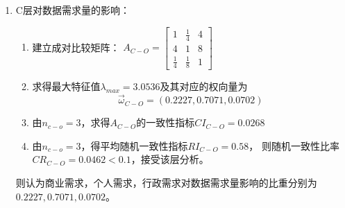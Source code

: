 \documentclass[UTF8,12pt]{ctexart}
\begin{document}
\begin{enumerate}
    \item C层对数据需求量的影响：
          \begin{enumerate}
              \item 建立成对比较矩阵：
                    $A_{C-O}=\begin{bmatrix}
                            1           & \frac{1}{4} & 4 \\
                            4           & 1           & 8 \\
                            \frac{1}{4} & \frac{1}{8} & 1
                        \end{bmatrix}$
              \item 求得最大特征值$\lambda _{max}=3.0536$及其对应的权向量为
                    $$\overrightarrow\omega_{C-O}=(0.2227,0.7071,0.0702)$$
              \item 由$n_{c-o}=3$，求得$A_{C-O}$的一致性指标$CI_{C-O}=0.0268$
              \item 由$n_{c-o}=3$，得平均随机一致性指标$RI_{C-O}=0.58$，
                    则随机一致性比率$CR_{C-O}=0.0462<0.1$，接受该层分析。\\
          \end{enumerate}
          则认为商业需求，个人需求，行政需求对数据需求量影响的比重分别为$0.2227,0.7071,0.0702$。


\end{enumerate}
\end{document}
